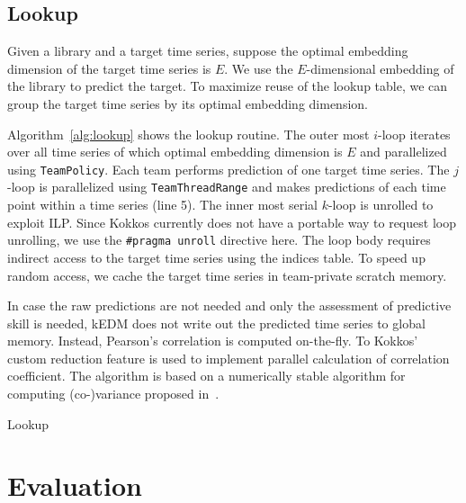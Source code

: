 \documentclass[conference]{IEEEtran}
\begin{document}
\subsection{Lookup}

Given a library and a target time series, suppose the optimal embedding
dimension of the target time series is $E$. We use the $E$-dimensional embedding
of the library to predict the target. To maximize reuse of the lookup table, we
can group the target time series by its optimal embedding dimension.

Algorithm~\ref{alg:lookup} shows the lookup routine. The outer most $i$-loop
iterates over all time series of which optimal embedding dimension is $E$ and
parallelized using \texttt{TeamPolicy}. Each team performs prediction of one
target time series. The $j$-loop is parallelized using \texttt{TeamThreadRange}
and makes predictions of each time point within a time series (line 5). The
inner most serial $k$-loop is unrolled to exploit ILP\@. Since Kokkos currently
does not have a portable way to request loop unrolling, we use the
\texttt{\#pragma unroll} directive here. The loop body requires indirect access
to the target time series using the indices table. To speed up random access, we
cache the target time series in team-private scratch memory.

In case the raw predictions are not needed and only the assessment of predictive
skill is needed, kEDM does not write out the predicted time series to global
memory. Instead, Pearson’s correlation is computed on-the-fly. To Kokkos’ custom
reduction feature is used to implement parallel calculation of correlation
coefficient. The algorithm is based on a numerically stable algorithm for
computing (co-)variance proposed in~\cite{Schubert2018}.

\begin{algorithm}
    \SetAlgoLined
    \DontPrintSemicolon
    \caption{Lookup}%
    \label{alg:lookup}
\end{algorithm}

\section{Evaluation}\label{sec:evaluation}
\end{document}
